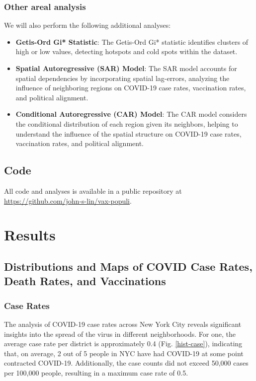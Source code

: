 \documentclass[10pt,journal,compsoc]{IEEEtran}
\begin{document}
\subsubsection{Other areal analysis}
We will also perform the following additional analyses:

\begin{itemize}
    \item \textbf{Getis-Ord Gi* Statistic}: The Getis-Ord Gi* statistic identifies clusters of high or low values, detecting hotspots and cold spots within the dataset.
    \item \textbf{Spatial Autoregressive (SAR) Model}: The SAR model accounts for spatial dependencies by incorporating spatial lag-errors, analyzing the influence of neighboring regions on COVID-19 case rates, vaccination rates, and political alignment.
    \item \textbf{Conditional Autoregressive (CAR) Model}: The CAR model considers the conditional distribution of each region given its neighbors, helping to understand the influence of the spatial structure on COVID-19 case rates, vaccination rates, and political alignment.
\end{itemize}

\subsection{Code}

All code and analyses is available in a public repository at \url{https://github.com/john-s-lin/vax-populi}.

\section{Results}

\subsection{Distributions and Maps of COVID Case Rates, Death Rates, and Vaccinations}

\subsubsection{Case Rates}

The analysis of COVID-19 case rates across New York City reveals significant insights into the spread of the virus in different neighborhoods. For one, the average case rate per district is approximately 0.4 (Fig. \ref{hist-case}), indicating that, on average, 2 out of 5 people in NYC have had COVID-19 at some point contracted COVID-19. Additionally, the case counts did not exceed 50,000 cases per 100,000 people, resulting in a maximum case rate of 0.5.
\end{document}
